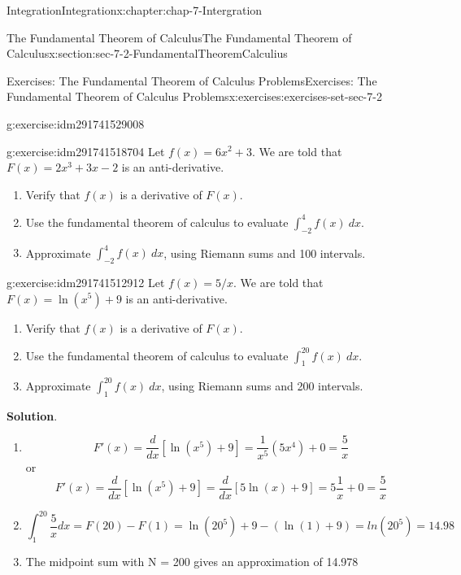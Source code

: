 \documentclass[oneside,10pt,]{book}
\numberwithin{equation}{section}
\begin{document}
\begin{chapterptx}{Integration}{}{Integration}{}{}{x:chapter:chap-7-Intergration}
\begin{sectionptx}{The Fundamental Theorem of Calculus}{}{The Fundamental Theorem of Calculus}{}{}{x:section:sec-7-2-FundamentalTheoremCalculius}
\begin{exercises-subsection}{Exercises: The Fundamental Theorem of Calculus Problems}{}{Exercises: The Fundamental Theorem of Calculus Problems}{}{}{x:exercises:exercises-set-sec-7-2}
\begin{divisionexercise}{1}{}{}{g:exercise:idm291741529008}
\begin{enumerate}[label=(\alph*)]
\begin{sidebyside}{1}{0.25}{0.25}{0}
\begin{sbspanel}{0.5}
\end{sbspanel}%
\end{sidebyside}%
\end{enumerate}
\end{divisionexercise}%
\begin{divisionexercise}{2}{}{}{g:exercise:idm291741518704}%
Let \(f(x) = 6 x^2 + 3\).  We are told that \(F(x) = 2 x^3 + 3 x - 2\) is an anti-derivative.%
%
\begin{enumerate}[label=(\alph*)]
\item{}Verify that \(f(x)\) is a derivative of \(F(x)\).%
\item{}Use the fundamental theorem of calculus to evaluate \(\int_{-2}^4 f(x)\  dx\).%
\item{}Approximate \(\int_{-2}^4 f(x)\ dx\), using Riemann sums and 100 intervals.%
\end{enumerate}
\end{divisionexercise}%
\begin{divisionexercise}{3}{}{}{g:exercise:idm291741512912}%
Let \(f(x) = 5/x\).  We are told that \(F(x) = \ln(x^5) + 9\) is an anti-derivative.%
%
\begin{enumerate}[label=(\alph*)]
\item{}Verify that \(f(x)\) is a derivative of \(F(x)\).%
\item{}Use the fundamental theorem of calculus to evaluate \(\int_1^{20} f(x)\ dx\).%
\item{}Approximate \(\int_1^{20} f(x)\ dx\), using Riemann sums and 200 intervals.%
\end{enumerate}
\par\smallskip%
\noindent\textbf{Solution}.\hypertarget{g:solution:idm291741507280}{}\quad{}%
\begin{enumerate}[label=(\alph*)]
\item{}%
\begin{equation*}
F' (x)=\frac{d}{dx} [\ln(x^5 )+ 9]=\frac{1}{x^5}   (5x^4 )+ 0=\frac{5}{x}
\end{equation*}
or%
%
\begin{equation*}
F' (x)=\frac{d}{dx} [\ln(x^5 )+ 9]=\frac{d}{dx} [5\ln(x)+ 9]=5\frac{1}{x}+ 0=\frac{5}{x}
\end{equation*}
\item{}%
\begin{equation*}
\int_1^{20}\frac{5}{x} dx=F(20)-F(1)=\ln(20^5 )+9-(\ln(1)+9)=ln(20^5) =14.98
\end{equation*}
%
\item{}The midpoint sum with N = 200 gives an approximation of 14.978%

\end{enumerate}
\end{divisionexercise}
\end{exercises-subsection}
\end{sectionptx}
\end{chapterptx}
\end{document}
